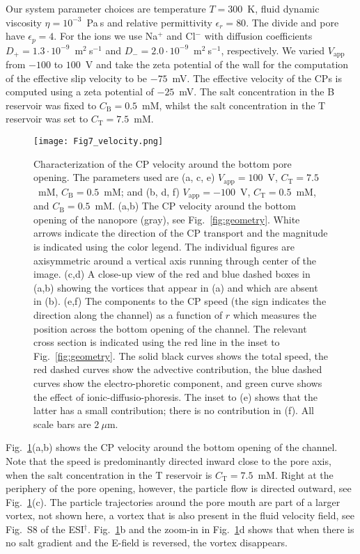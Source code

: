 \documentclass[twoside,twocolumn,9pt]{article}
\begin{document}
Our system parameter choices are temperature $T = 300$~K, fluid dynamic viscosity $\eta = 10^{-3}$~Pa$\:$s and relative permittivity $\epsilon_{r} = 80$. The divide and pore have $\epsilon_{p} = 4$. For the ions we use Na$^{+}$ and Cl$^{-}$ with diffusion coefficients  $D_{+} = 1.3 \cdot 10^{-9}$~m$^{2} \:$s$^{-1}$ and $D_{-} = 2.0 \cdot 10^{-9}$~m$^{2} \:$s$^{-1}$, respectively. We varied $V_{\mathrm{app}}$ from $-100$ to $100$~V and take the zeta potential of the wall for the computation of the effective slip velocity to be $-75$~mV. 
The effective velocity of the CPs is computed using a zeta potential of $-25$~mV. 
The salt concentration in the B reservoir was fixed to $C_{\mathrm{B}} = 0.5$~mM, whilst the salt concentration in the T reservoir was set to $C_{\mathrm{T}} = 7.5$~mM.

\begin{figure}[!h]
 \centering\texttt{[image: Fig7\_velocity.png]}
 \caption{\label{fig:computational}Characterization of the CP velocity around the bottom pore opening. The parameters used are (a, c, e) $V_{\mathrm{app}} = 100$~V, $C_{\mathrm{T}} = 7.5$~mM,  $C_{\mathrm{B}} = 0.5$~mM; and (b, d, f) $V_{\mathrm{app}} = -100$~V, $C_{\mathrm{T}}=0.5$~mM, and $C_{\mathrm{B}} = 0.5$~mM. (a,b) The CP velocity around the bottom opening of the nanopore (gray), see Fig.~\ref{fig:geometry}. White arrows indicate the direction of the CP transport and the magnitude is indicated using the color legend. The individual figures are axisymmetric around a vertical axis running through center of the image. (c,d) A close-up view of the red and blue dashed boxes in (a,b) showing the vortices that appear in (a) and which are absent in (b). (e,f) The components to the CP speed (the sign indicates the direction along the channel) as a function of $r$ which measures the position across the bottom opening of the channel. The relevant cross section is indicated using the red line in the inset to Fig.~\ref{fig:geometry}. The solid black curves shows the total speed, the red dashed curves show the advective contribution, the blue dashed curves show the electro-phoretic component, and green curve shows the effect of ionic-diffusio-phoresis. The inset to (e) shows that the latter has a small contribution; there is no contribution in (f). All scale bars are $2~\mu$m.}
\end{figure} 

Fig.~\ref{fig:computational}(a,b) shows the CP velocity around the bottom opening of the channel. Note that the speed is predominantly directed inward close to the pore axis, when the salt concentration in the T reservoir is $C_{\mathrm{T}}=7.5$~mM. Right at the periphery of the pore opening, however, the particle flow is directed outward, see Fig.~\ref{fig:computational}(c). The particle trajectories around the pore mouth are part of a larger vortex, not shown here, a vortex that is also present in the fluid velocity field, see Fig.~S8 of the ESI$^{\dag}$. Fig.~\ref{fig:computational}b and the zoom-in in Fig.~\ref{fig:computational}d shows that when there is no salt gradient and the E-field is reversed, the vortex disappears.
\end{document}
